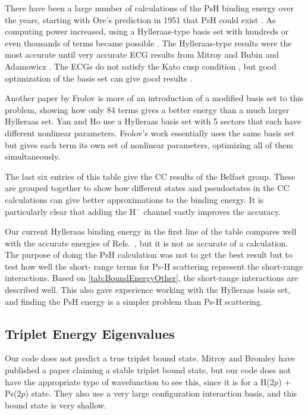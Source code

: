 \documentclass[Dissertation.tex]{subfiles}
\begin{document}
There have been a large number of calculations of the PsH binding energy over 
the years, starting with Ore's prediction in 1951 that PsH could exist
\cite{Ore1951}. As computing power increased, using a Hylleraas-type basis 
set with hundreds or even thousands of terms became possible
\cite{Ho1978,Ho1986,Yan1999,VanReeth2003}. The Hylleraas-type results were 
the most accurate until very accurate ECG results from Mitroy
\cite{Mitroy2006} and Bubin and Adamowicz \cite{Bubin2004,Bubin2006}. The 
ECGs do not satisfy the Kato cusp condition \cite{Kato1957}, but good
optimization of the basis set can give good results \cite{Mitroy2013}.

Another paper by Frolov \cite{Frolov2010} is more of an introduction of a 
modified basis set to this problem, showing how only 84 terms gives a better 
energy than a much larger Hylleraas set. Yan and Ho \cite{Yan1999} use a 
Hylleraas basis set with 5 sectors that each have different nonlinear 
parameters. Frolov's work essentially uses the same basis set but gives each 
term its own set of nonlinear parameters, optimizing all of them 
simultaneously.

The last six entries of this table give the CC results of the Belfast group. 
These are grouped together to show how different states and pseudostates in 
the CC calculations can give better approximations to the binding energy. It 
is particularly clear that adding the H$^-$ channel vastly improves the 
accuracy.

Our current Hylleraas binding energy in the first line of the table compares
well with the accurate energies of Refs.~\cite{Bubin2006, Mitroy2006, Yan1999},
but it is not as accurate of a calculation. The purpose of doing the PsH 
calculation was not to get the best result but to test how well the short-
range terms for Ps-H scattering represent the short-range interactions. Based 
on \cref{tab:BoundEnergyOther}, the short-range interactions are described 
well. This also gave experience working with the Hylleraas basis set, and 
finding the PsH energy is a simpler problem than Ps-H scattering.

\subsection{Triplet Energy Eigenvalues}
\label{sec:TripletEigenvalues}

Our code does not predict a true triplet bound state. Mitroy and Bromley have 
published a paper \cite{Mitroy2007} claiming a stable triplet bound state, 
but our code does not have the appropriate type of wavefunction to see this, 
since it is for a H($2p$) + Ps($2p$) state. They also use a very large 
configuration interaction basis, and this bound state is very shallow. 
\end{document}
